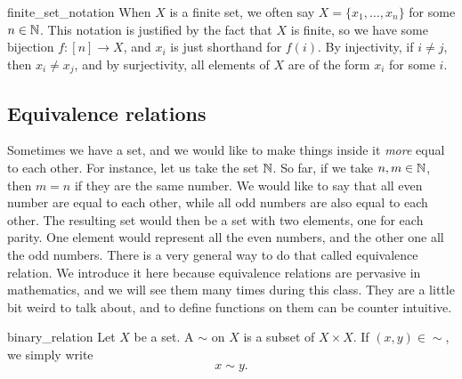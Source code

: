 \begin{crem}{}{finite_set_notation}
    When \( X \) is a finite set, we often say \( X = \{ x_1, \dots, x_n \} \) for some \( n \in \mathbb{N} \). This notation is justified by the fact that \( X \) is finite, so we have some bijection \( f : [n] \to X \), and \( x_i \) is just shorthand for \( f(i) \). By injectivity, if \( i \neq j \), then \( x_i \neq x_j \), and by surjectivity, all elements of \( X \) are of the form \( x_i \) for some \( i \).
\end{crem}

\subsection{Equivalence relations}

Sometimes we have a set, and we would like to make things inside it \textit{more} equal to each other. For instance, let us take the set \( \mathbb{N} \). So far, if we take \( n, m \in \mathbb{N} \), then \( m = n \) if they are the same number. We would like to say that all even number are equal to each other, while all odd numbers are also equal to each other. The resulting set would then be a set with two elements, one for each parity. One element would represent all the even numbers, and the other one all the odd numbers. There is a very general way to do that called equivalence relation. We introduce it here because equivalence relations are pervasive in mathematics, and we will see them many times during this class. They are a little bit weird to talk about, and to define functions on them can be counter intuitive. 

\begin{cdef}{}{binary_relation}
    Let \( X \) be a set. A  \( \sim \) on \( X \) is a subset of \( X \times X \). If \( (x, y) \in \sim \), we simply write
    \begin{equation*}
        x \sim y.
    \end{equation*} 
\end{cdef}

